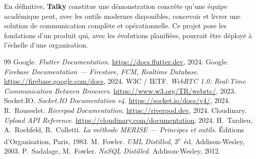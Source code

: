 \documentclass[12pt,a4paper]{report}
\begin{document}
En définitive, \textbf{Talky} constitue une démonstration concrète qu'une équipe académique peut, avec les outils modernes disponibles, concevoir et livrer une solution de communication complète et opérationnelle. Ce projet pose les fondations d'un produit qui, avec les évolutions planifiées, pourrait être déployé à l'échelle d'une organisation.

\begin{thebibliography}{99}
  Google. \textit{Flutter Documentation}. \url{https://docs.flutter.dev}, 2024.
  Google. \textit{Firebase Documentation --- Firestore, FCM, Realtime Database}.
  \url{https://firebase.google.com/docs}, 2024.
  W3C / IETF. \textit{WebRTC 1.0: Real-Time Communication Between Browsers}.
  \url{https://www.w3.org/TR/webrtc/}, 2023.
  Socket.IO. \textit{Socket.IO Documentation v4}.
  \url{https://socket.io/docs/v4/}, 2024.
  R.~Rousselet. \textit{Riverpod Documentation}.
  \url{https://riverpod.dev}, 2024.
  Cloudinary. \textit{Upload API Reference}.
  \url{https://cloudinary.com/documentation}, 2024.
  H.~Tardieu, A.~Rochfeld, R.~Colletti.
  \textit{La méthode MERISE --- Principes et outils}.
  Éditions d'Organisation, Paris, 1983.
  M.~Fowler.
  \textit{UML Distilled}, 3\textsuperscript{e}~éd. Addison-Wesley, 2003.
  P.~Sadalage, M.~Fowler.
  \textit{NoSQL Distilled}. Addison-Wesley, 2012.
\end{thebibliography}

\appendix
\end{document}
